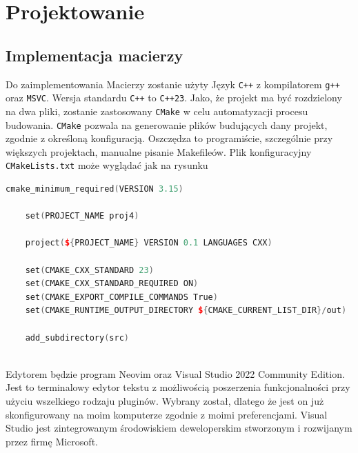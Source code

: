 	\newpage
\section{Projektowanie}		%

\subsection{Implementacja macierzy}


Do zaimplementowania Macierzy zostanie użyty Język \texttt{C++} z kompilatorem \texttt{g++} oraz \texttt{MSVC}. Wersja standardu \texttt{C++} to \texttt{C++23}. Jako, że projekt ma być rozdzielony na dwa pliki, zostanie zastosowany \texttt{CMake} w celu automatyzacji procesu budowania. \texttt{CMake} pozwala na generowanie plików budujących dany projekt, zgodnie z określoną konfiguracją. Oszczędza to programiście, szczególnie przy większych projektach, manualne pisanie Makefileów.
Plik konfiguracyjny \texttt{CMakeLists.txt} może wyglądać jak na rysunku

\begin{lstlisting}[caption=Plik konfiguracyjny CMake, label={lst:cmakelists}, language=C++]
	cmake_minimum_required(VERSION 3.15)
	
	set(PROJECT_NAME proj4)
	
	project(${PROJECT_NAME} VERSION 0.1 LANGUAGES CXX)
	
	set(CMAKE_CXX_STANDARD 23)
	set(CMAKE_CXX_STANDARD_REQUIRED ON)
	set(CMAKE_EXPORT_COMPILE_COMMANDS True)
	set(CMAKE_RUNTIME_OUTPUT_DIRECTORY ${CMAKE_CURRENT_LIST_DIR}/out)
	
	add_subdirectory(src)
	
\end{lstlisting}

Edytorem będzie program Neovim oraz Visual Studio 2022 Community Edition. Jest to terminalowy edytor tekstu z możliwością poszerzenia funkcjonalności przy użyciu wszelkiego rodzaju pluginów. Wybrany został, dlatego że jest on już skonfigurowany na moim komputerze zgodnie z moimi preferencjami. Visual Studio jest zintegrowanym środowiskiem deweloperskim stworzonym i rozwijanym przez firmę Microsoft.

